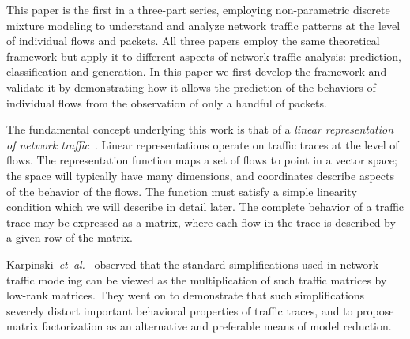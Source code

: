\documentclass[conference]{IEEEtran}
\title{\vspace{-0.25em}\thetitle}
\author{
{\large{Stefan~Karpinski, John~R.~Gilbert, Elizabeth~M.~Belding}} \vspace{0.25em}\\
Department of Computer Science \\
University of California, Santa Barbara \vspace{0.35em}\\
\textit{\{sgk,gilbert,ebelding\}@cs.ucsb.edu}
}
\begin{document}
\maketitle


This paper is the first in a three-part series, employing non-parametric discrete mixture modeling to understand and analyze network traffic patterns at the level of individual flows and packets.\flownote
All three papers employ the same theoretical framework but apply it to different aspects of network traffic analysis: prediction, classification and generation.
In this paper we first develop the framework and validate it by demonstrating how it allows the prediction of the behaviors of individual flows from the observation of only a handful of packets.

The fundamental concept underlying this work is that of a \emph{linear representation of network traffic}~\cite{Karpinski08}.
Linear representations operate on traffic traces at the level of flows.
The representation function maps a set of flows to point in a vector space;
the space will typically have many dimensions, and coordinates describe aspects of the  behavior of the flows.
The function must satisfy a simple linearity condition which we will describe in detail later.
The complete behavior of a traffic trace may be expressed as a matrix, where each flow in the trace is described by a given row of the matrix.

Karpinski~\emph{et~al.}~\cite{Karpinski08} observed that the standard simplifications used in network traffic modeling can be viewed as the multiplication of such traffic matrices by  low-rank matrices.
They went on to demonstrate that such simplifications severely distort important behavioral properties of traffic traces, and to propose matrix factorization as an alternative and preferable means of model reduction.




\end{document}
